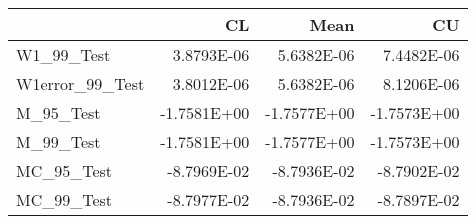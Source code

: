 \begin{tabular}{lrrr}
\toprule
{} &          CL &        Mean &          CU \\
\midrule
W1\_99\_Test      &  3.8793E-06 &  5.6382E-06 &  7.4482E-06 \\
W1error\_99\_Test &  3.8012E-06 &  5.6382E-06 &  8.1206E-06 \\
M\_95\_Test       & -1.7581E+00 & -1.7577E+00 & -1.7573E+00 \\
M\_99\_Test       & -1.7581E+00 & -1.7577E+00 & -1.7573E+00 \\
MC\_95\_Test      & -8.7969E-02 & -8.7936E-02 & -8.7902E-02 \\
MC\_99\_Test      & -8.7977E-02 & -8.7936E-02 & -8.7897E-02 \\
\bottomrule
\end{tabular}
